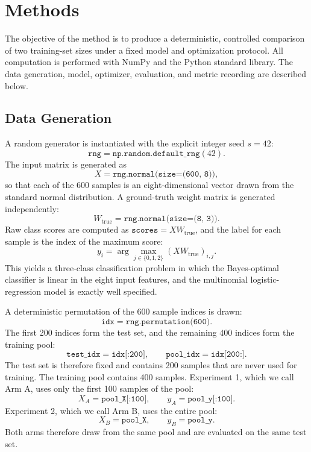 \documentclass[10pt]{article}
\begin{document}
\section{Methods}
The objective of the method is to produce a deterministic, controlled comparison of two training-set sizes under a fixed model and optimization protocol. All computation is performed with NumPy and the Python standard library. The data generation, model, optimizer, evaluation, and metric recording are described below.

\subsection{Data Generation}
A random generator is instantiated with the explicit integer seed \(s = 42\):
\[
\texttt{rng} = \texttt{np.random.default\_rng}(42).
\]
The input matrix is generated as
\[
X = \texttt{rng.normal(size=(600, 8))},
\]
so that each of the 600 samples is an eight-dimensional vector drawn from the standard normal distribution. A ground-truth weight matrix is generated independently:
\[
W_{\mathrm{true}} = \texttt{rng.normal(size=(8, 3))}.
\]
Raw class scores are computed as \(\texttt{scores} = X W_{\mathrm{true}}\), and the label for each sample is the index of the maximum score:
\[
y_i = \arg\max_{j \in \{0,1,2\}} (X W_{\mathrm{true}})_{i,j}.
\]
This yields a three-class classification problem in which the Bayes-optimal classifier is linear in the eight input features, and the multinomial logistic-regression model is exactly well specified.

A deterministic permutation of the 600 sample indices is drawn:
\[
\texttt{idx} = \texttt{rng.permutation(600)}.
\]
The first 200 indices form the test set, and the remaining 400 indices form the training pool:
\[
\texttt{test\_idx} = \texttt{idx[:200]}, \qquad
\texttt{pool\_idx} = \texttt{idx[200:]}.
\]
The test set is therefore fixed and contains 200 samples that are never used for training. The training pool contains 400 samples. Experiment 1, which we call Arm A, uses only the first 100 samples of the pool:
\[
X_A = \texttt{pool\_X[:100]}, \qquad y_A = \texttt{pool\_y[:100]}.
\]
Experiment 2, which we call Arm B, uses the entire pool:
\[
X_B = \texttt{pool\_X}, \qquad y_B = \texttt{pool\_y}.
\]
Both arms therefore draw from the same pool and are evaluated on the same test set.
\end{document}
